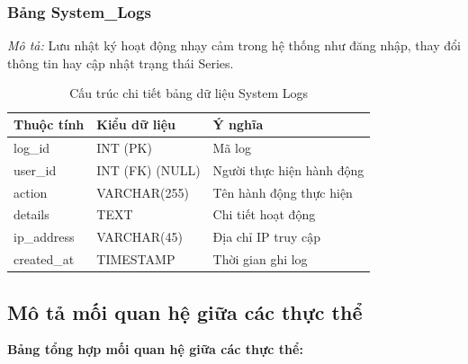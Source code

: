 \subsubsection{Bảng System\_Logs}
\label{subsubsec:tbl_system_logs}
\textit{Mô tả:} Lưu nhật ký hoạt động nhạy cảm trong hệ thống như đăng nhập, thay đổi thông tin hay cập nhật trạng thái Series.

\noindent
\begin{table}[H]
\centering
\renewcommand{\arraystretch}{1.3}
\begin{tabularx}{\textwidth}{|p{4cm}|p{3cm}|>{\raggedright\arraybackslash}X|}
\hline
\rowcolor{tableheader}
\textbf{Thuộc tính} & \textbf{Kiểu dữ liệu} & \textbf{Ý nghĩa} \\ \hline
log\_id & INT (PK) & Mã log \\ \hline
user\_id & INT (FK) (NULL) & Người thực hiện hành động \\ \hline
action & VARCHAR(255) & Tên hành động thực hiện \\ \hline
details & TEXT & Chi tiết hoạt động \\ \hline
ip\_address & VARCHAR(45) & Địa chỉ IP truy cập \\ \hline
created\_at & TIMESTAMP & Thời gian ghi log \\ \hline
\end{tabularx}
\caption{Cấu trúc chi tiết bảng dữ liệu System Logs}
\label{tab:db_system_logs}
\end{table}
\vspace{0.5cm}

\subsection{Mô tả mối quan hệ giữa các thực thể}
\label{subsec:sdd_db_relationships}

\vspace{0.2cm}
\noindent
\textbf{Bảng tổng hợp mối quan hệ giữa các thực thể:}
\vspace{0.2cm}

